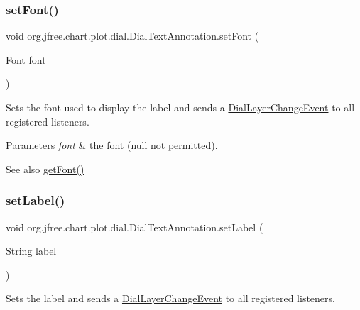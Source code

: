 \subsubsection{\texorpdfstring{set\+Font()}{setFont()}}
{\footnotesize\ttfamily void org.\+jfree.\+chart.\+plot.\+dial.\+Dial\+Text\+Annotation.\+set\+Font (\begin{DoxyParamCaption}\item[{Font}]{font }\end{DoxyParamCaption})}

Sets the font used to display the label and sends a \mbox{\hyperlink{classorg_1_1jfree_1_1chart_1_1plot_1_1dial_1_1_dial_layer_change_event}{Dial\+Layer\+Change\+Event}} to all registered listeners.


\begin{DoxyParams}{Parameters}
{\em font} & the font ({\ttfamily null} not permitted).\\
\hline
\end{DoxyParams}
\begin{DoxySeeAlso}{See also}
\mbox{\hyperlink{classorg_1_1jfree_1_1chart_1_1plot_1_1dial_1_1_dial_text_annotation_ae6f8a6c1529da255183d2c72957ab9c0}{get\+Font()}} 
\end{DoxySeeAlso}
\mbox{\label{classorg_1_1jfree_1_1chart_1_1plot_1_1dial_1_1_dial_text_annotation_af2af7c2986a8714ee9cd3cc940c1603b}} 
\subsubsection{\texorpdfstring{set\+Label()}{setLabel()}}
{\footnotesize\ttfamily void org.\+jfree.\+chart.\+plot.\+dial.\+Dial\+Text\+Annotation.\+set\+Label (\begin{DoxyParamCaption}\item[{String}]{label }\end{DoxyParamCaption})}

Sets the label and sends a \mbox{\hyperlink{classorg_1_1jfree_1_1chart_1_1plot_1_1dial_1_1_dial_layer_change_event}{Dial\+Layer\+Change\+Event}} to all registered listeners.


